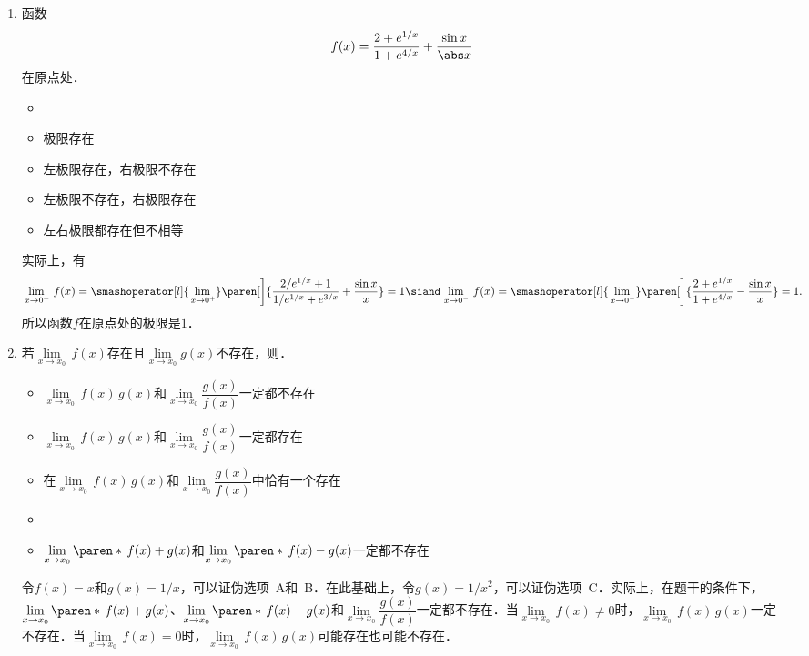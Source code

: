 \begin{enumerate}
\item 函数
  \begin{equation*}
    f(x) = \frac{2+e^{1/x}}{1+e^{4/x}} + \frac{\sin x}{\abs x}
  \end{equation*}
  在原点处\uline{\makebox[6em]{}}．
  \begin{itemize}
    \renewcommand{\labelitemi}{\faCircleThin}
    \ifshowsol
  \item[\faCircle]
    \else
  \item
    \fi
    极限存在
  \item 左极限存在，右极限不存在
  \item 左极限不存在，右极限存在
  \item 左右极限都存在但不相等
  \end{itemize}

  \ifshowsol
  实际上，有
  \begin{gather*}
    \lim_{\,x\to0^+} \,f(x)
    = {}\smashoperator[l]{\lim_{\,x\to0^+}} \paren[\bigg]{\frac{2/e^{1/x} + 1}{1/e^{1/x} + e^{3/x}} + \frac{\sin x}{x}}
    = 1
    \siand
    \lim_{\,x\to0^-} \,f(x)
    = {}\smashoperator[l]{\lim_{\,x\to0^-}} \paren[\bigg]{\frac{2+e^{1/x}}{1+e^{4/x}} - \frac{\sin x}{x}}
    = 1.
  \end{gather*}
  所以函数\(f\)在原点处的极限是\(1\)．
  \fi

\item 若\(\lim\limits_{x \to x_0} \,f(x)\)存在且\(\lim\limits_{x \to x_0} g(x)\)不存在，则\uline{\makebox[10em]{}}．
  \begin{itemize}[itemsep=1ex]
    \renewcommand{\labelitemi}{\faCircleThin}
  \item \(\lim\limits_{x \to x_0} \,f(x)\,g(x)\)和\(\lim\limits_{x \to x_0} \dfrac{g(x)}{f(x)}\)一定都不存在
  \item \(\lim\limits_{x \to x_0} \,f(x)\,g(x)\)和\(\lim\limits_{x \to x_0} \dfrac{g(x)}{f(x)}\)一定都存在
  \item 在\(\lim\limits_{x \to x_0} \,f(x)\,g(x)\)和\(\lim\limits_{x \to x_0} \dfrac{g(x)}{f(x)}\)中恰有一个存在
    \ifshowsol
  \item[\faCircle]
    \else
  \item
    \fi
    \(\lim\limits_{x \to x_0} \paren*{\,f(x)+g(x)}\)和\(\lim\limits_{x \to x_0} \paren*{\,f(x)-g(x)}\)一定都不存在
  \end{itemize}

  \ifshowsol
  令\(f(x) = x\)和\(g(x) = 1/x\)，可以证伪选项~A和~B．在此基础上，令\(g(x) = 1/x^2\)，可以证伪选项~C．实际上，在题干的条件下，\(\lim\limits_{x \to x_0} \paren*{\,f(x)+g(x)}\)、\(\lim\limits_{x \to x_0} \paren*{\,f(x)-g(x)}\)和\(\lim\limits_{x \to x_0} \dfrac{g(x)}{f(x)}\)一定都不存在．当\(\lim\limits_{x \to x_0} \,f(x) \ne 0\)时，\(\lim\limits_{x \to x_0} \,f(x)\,g(x)\)一定不存在．当\(\lim\limits_{x \to x_0} \,f(x) = 0\)时，\(\lim\limits_{x \to x_0} \,f(x)\,g(x)\)可能存在也可能不存在．
  \fi


\end{enumerate}
